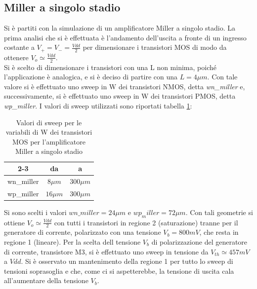 \documentclass[a4paper]{article}
\begin{document}
        \subsection*{Miller a singolo stadio}
            Si è partiti con la simulazione di un amplificatore Miller a singolo stadio. La prima analisi che si è effettuata è l'andamento dell'uscita a fronte di un ingresso costante a $V_+ = V_- = \frac{Vdd}{2}$ per dimensionare i transistori MOS di modo da ottenere $V_o \simeq \frac{Vdd}{2}$. \\
            Si è scelto di dimensionare i transistori con una L non minima, poiché l'applicazione è analogica, e si è deciso di partire con una $L = 4\mu m$. Con tale valore si è effettuato uno sweep in W dei transistori NMOS, detta \textit{wn\_miller} e, successivamente, si è effettuato uno sweep in W dei transistori PMOS, detta \textit{wp\_miller}.
            I valori di sweep utilizzati sono riportati tabella \ref{tab:sweep_wn_wp}:
            \begin{table}[]
                \centering
                \begin{tabular}{c|c|c|}
                    \cline{2-3}
                                                     & da        & a          \\ \hline
                    \multicolumn{1}{|c|}{wn\_miller} & $8\mu m$  & $300\mu m$ \\ \hline
                    \multicolumn{1}{|c|}{wp\_miller} & $16\mu m$ & $300\mu m$ \\ \hline
                    \end{tabular}
                \label{tab:sweep_wn_wp}
                \caption[short]{Valori di sweep per le variabili di W dei transistori MOS per l'amplificatore Miller a singolo stadio}
            \end{table}
            Si sono scelti i valori $wn\_miller = 24\mu m$ e $wp_miller = 72\mu m$. 
            Con tali geometrie si ottiene $V_o \simeq \frac{Vdd}{2}$ con tutti i transistori in regione 2 (saturazione) tranne per il generatore di corrente, polarizzato con una tensione $V_b = 800mV$, che resta in regione 1 (lineare).
            Per la scelta dell tensione $V_b$ di polarizzazione del generatore di corrente, transistore M3, si è effettuato uno sweep in tensione da $V_{th} \simeq 457mV$ a $Vdd$. Si è osservato un mantenimento della regione 1 per tutto lo sweep di tensioni soprasoglia e che, come ci si aspetterebbe, la tensione di uscita cala all'aumentare della tensione $V_b$. 
\end{document}
